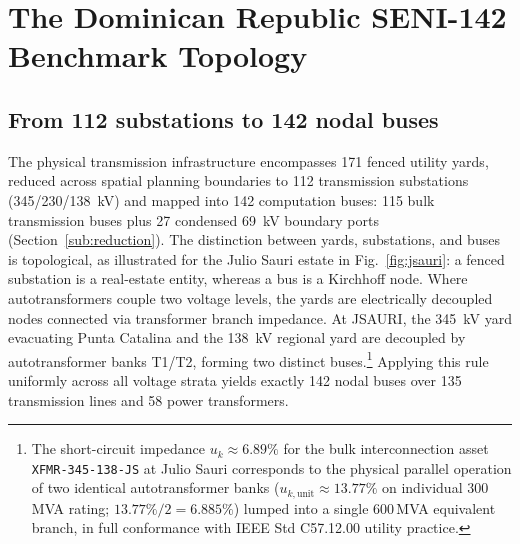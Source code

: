 \section{The Dominican Republic SENI-142 Benchmark Topology}
\label{sec:topology}

\subsection{From 112 substations to 142 nodal buses}
\label{sub:substations}

The physical transmission infrastructure encompasses 171 fenced utility yards, reduced across spatial planning boundaries to 112 transmission substations (345/230/138~kV) and mapped into 142 computation buses: 115 bulk transmission buses plus 27 condensed 69~kV boundary ports (Section~\ref{sub:reduction}). The distinction between yards, substations, and buses is topological, as illustrated for the Julio Sauri estate in Fig.~\ref{fig:jsauri}: a fenced substation is a real-estate entity, whereas a bus is a Kirchhoff node. Where autotransformers couple two voltage levels, the yards are electrically decoupled nodes connected via transformer branch impedance. At JSAURI, the 345~kV yard evacuating Punta Catalina and the 138~kV regional yard are decoupled by autotransformer banks T1/T2, forming two distinct buses.\footnote{The short-circuit impedance $u_k \approx 6.89\%$ for the bulk interconnection asset \texttt{XFMR-345-138-JS} at Julio Sauri corresponds to the physical parallel operation of two identical autotransformer banks ($u_{k,\mathrm{unit}} \approx 13.77\%$ on individual 300\,MVA rating; $13.77\% / 2 = 6.885\%$) lumped into a single 600\,MVA equivalent branch, in full conformance with IEEE Std C57.12.00 utility practice.} Applying this rule uniformly across all voltage strata yields exactly 142 nodal buses over 135 transmission lines and 58 power transformers.

